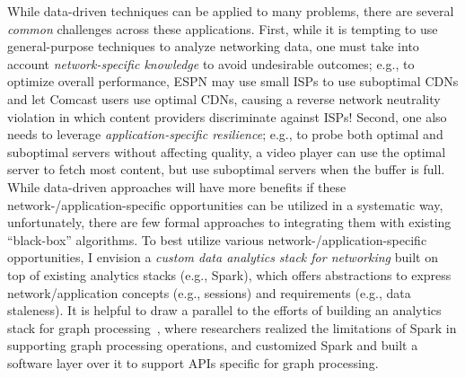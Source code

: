 While data-driven techniques can be applied to many problems, there are several {\em common} challenges across these applications.
First, while it is tempting to use general-purpose techniques to analyze networking data, one must take into account {\em network-specific knowledge} to avoid undesirable outcomes; 
e.g., to optimize overall performance, ESPN may use small ISPs to use suboptimal CDNs and let Comcast users use optimal CDNs, causing a reverse network neutrality violation in which content providers discriminate against ISPs!
Second, one also needs to leverage {\em application-specific resilience}; e.g., to probe both optimal and suboptimal servers without affecting quality, a video player can use the optimal server to fetch most content, but use suboptimal servers when the buffer is full. 
While data-driven approaches will have more benefits if these network-/application-specific opportunities can be utilized in a systematic way, unfortunately, there are few formal approaches to integrating them with existing ``black-box'' algorithms.
To best utilize various network-/application-specific opportunities, I envision a {\em custom data analytics stack for networking} built on top of existing analytics stacks (e.g., Spark), which offers abstractions to express network/application concepts (e.g., sessions) and requirements (e.g., data staleness).
It is helpful to draw a parallel to the efforts of building an analytics stack for graph processing~\cite{graphx}, where researchers realized the limitations of Spark in supporting graph processing operations, and customized Spark and built a software layer over it to support APIs specific for graph processing.

